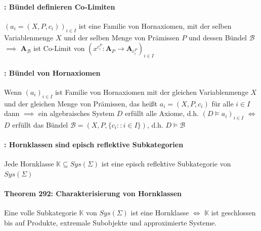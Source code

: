 \paragraph{: Bündel definieren Co-Limiten}
$\left(a_{i}=\left(X,P,c_{i}\right)\right)_{i\in I}$ ist eine Familie von Hornaxiomen, mit der selben Variablenmenge
$X$ und der selben Menge von Prämissen $P$ und dessen Bündel $\mathcal{B}$ \\ 
$\implies$  $\mathbf{A}_{\mathcal{B}}$
ist Co-Limit von $\left(x^{c_{i}^{P}}:\mathbf{A}_{P}\rightarrow\mathbf{A}_{c_{i}^{P}}\right)_{i\in I}$

\paragraph{: Bündel von Hornaxiomen}
Wenn $(a_i)_{i \in I}$ ist Familie von Hornaxiomen mit der gleichen Variablenmenge $X$ und der gleichen Menge von Prämissen, das heißt $a_i = (X, P, c_i)$ für alle $i \in I$ \\
dann $\implies$ ein algebraisches System $D$ erfüllt alle Axiome, d.h. $(D \models a_i)_{i \in I}$ $\Leftrightarrow$ $D$ erfüllt das Bündel $\mathcal{B} = (X, P, \{c_i:: i \in I\})$, d.h. $D \models \mathcal{B}$

\paragraph{: Hornklassen sind episch reflektive Subkategorien}
Jede Hornklasse $\mathbb{K} \subseteq Sys(\Sigma)$ ist eine episch reflektive Subkategorie von $Sys(\Sigma)$

\paragraph{Theorem 292: Charakterisierung von Hornklassen}
Eine volle Subkategorie $\mathbb{K}$ von $Sys(\Sigma)$ ist eine Hornklasse $\Leftrightarrow$ $\mathbb{K}$ ist geschlossen bis auf Produkte, extremale Subobjekte und approximierte Systeme.



